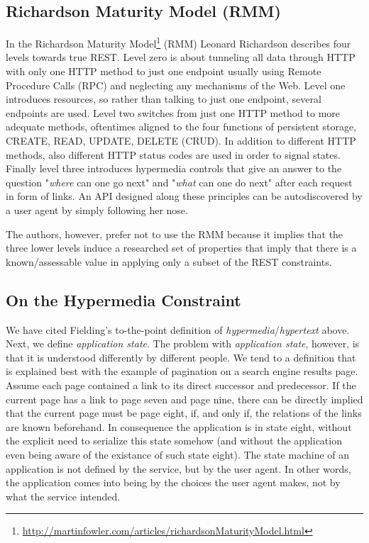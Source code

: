 \documentclass{acm_proc_article-sp}
\begin{document}
\subsection{Richardson Maturity Model (RMM)}\label{sec:rmm}
In the Richardson Maturity Model\footnote{\url{http://martinfowler.com/articles/richardsonMaturityModel.html}} (RMM) Leonard Richardson describes four levels towards true REST. Level zero is about tunneling all data through HTTP with only one HTTP method to just one endpoint usually using Remote Procedure Calls (RPC) and neglecting any mechanisms of the Web. Level one introduces resources, so rather than talking to just one endpoint, several endpoints are used. Level two switches from just one HTTP method to more adequate methods, oftentimes aligned to the four functions of persistent storage, CREATE, READ, UPDATE, DELETE (CRUD). In addition to different HTTP methods, also different HTTP status codes are used in order to signal states. Finally level three introduces hypermedia controls that give an answer to the question "\textit{where} can one go next" and "\textit{what} can one do next" after each request in form of links. An API designed along these principles can be autodiscovered by a user agent by simply following her nose.

The authors, however, prefer not to use the RMM because it implies that the three lower levels induce a researched set of properties that imply that there is a known/assessable value in applying only a subset of the REST constraints.

\subsection{On the Hypermedia Constraint}\label{sec:hateoas}
We have cited Fielding's to-the-point definition of \textit{hypermedia}/\textit{hypertext} above. Next, we define \textit{application state}. The problem with \textit{application state}, however, is that it is understood differently by different people. We tend to a definition that is explained best with the example of pagination on a search engine results page. Assume each page contained a link to its direct successor and predecessor. If the current page has a link to page seven and page nine, there can be directly implied that the current page must be page eight, if, and only if, the relations of the links are known beforehand. In consequence the application is in state eight, without the explicit need to serialize this state somehow (and without the application even being aware of the existance of such state eight). The state machine of an application is not defined by the service, but by the user agent. In other words, the application comes into being by the choices the user agent makes, not by what the service intended.
\end{document}

